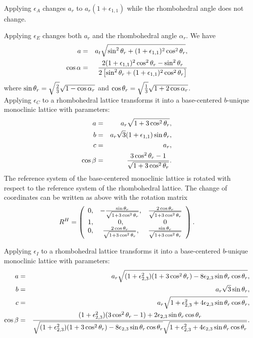 \documentclass[12pt,a4paper]{article}
\begin{document}
Applying $\epsilon_A$ changes $a_r$ to $a_r (1+\epsilon_{1,1})$ while the
rhombohedral angle does not change.

Applying $\epsilon_E$ changes both $a_r$ and the rhombohedral angle
$\alpha_r$. We have 
\begin{eqnarray}
a&=&a_t \sqrt{\sin^2\theta_r + (1 + \epsilon_{1,1})^2 \cos^2\theta_r}, \\
\cos\alpha &=& {
2(1 + \epsilon_{1,1})^2 \cos^2\theta_r -\sin^2\theta_r  \over
2 \left[\sin^2\theta_r+ (1 + \epsilon_{1,1})^2 \cos^2\theta_r\right]}
\end{eqnarray}
where 
$\sin{\theta_r}=\sqrt{2\over 3}\sqrt{1-\cos{\alpha_r}}$
and $\cos{\theta_r}=\sqrt{1\over 3}\sqrt{1 + 2 \cos{\alpha_r}}$. \\

Applying $\epsilon_C$ to a rhombohedral lattice transforms it into a
base-centered $b$-unique monoclinic lattice with parameters:
\begin{eqnarray}
a&=&a_r \sqrt{1 + 3 \cos^2 \theta_r}, \\
b&=&a_r \sqrt{3} (1 + \epsilon_{1,1}) \sin \theta_r, \\
c&=&a_r, \\
\cos\beta &=& {3 \cos^2 \theta_r -1 \over \sqrt{1 + 3 \cos^2 \theta_r} }.
\end{eqnarray}
The reference system of the base-centered monoclinic lattice is rotated 
with respect to the reference system of the rhombohedral lattice.
The change of coordinates can be written as above with the rotation matrix 
\begin{equation}
R^H=\left( \begin{array}{ccc}
0, & -{\sin\theta_r \over \sqrt{1 + 3 \cos^2 \theta_r}}, &  {2\cos\theta_r \over \sqrt{1 + 3 \cos^2 \theta_r}}\\
1, & 0, & 0  
\\
0, & {2\cos\theta_r \over \sqrt{1 + 3 \cos^2 \theta_r}}, & 
{\sin\theta_r \over \sqrt{1 + 3 \cos^2 \theta_r}} 
\end{array}
\right).
\end{equation}

Applying $\epsilon_I$ to a rhombohedral lattice transforms it into a
base-centered $b$-unique monoclinic lattice with parameters:
\begin{eqnarray}
a&=&a_r \sqrt{(1+\epsilon_{2,3}^2)(1 + 3 \cos^2 \theta_r)-
8\epsilon_{2,3}\sin \theta_r\cos \theta_r}, \\
b&=&a_r \sqrt{3}\sin \theta_r, \\
c&=&a_r \sqrt{1+\epsilon_{2,3}^2+4\epsilon_{2,3}\sin \theta_r\cos \theta_r}, \\
\cos\beta &=& {(1+\epsilon_{2,3}^2) (3 \cos^2 \theta_r-1) 
+ 2 \epsilon_{2,3} \sin \theta_r\cos \theta_r
\over \sqrt{(1+\epsilon_{2,3}^2)(1 + 3 \cos^2 \theta_r)-
8\epsilon_{2,3}\sin \theta_r\cos \theta_r} \sqrt{1+\epsilon_{2,3}^2+4\epsilon_{2,3}\sin \theta_r\cos \theta_r}}.
\end{eqnarray}
\end{document}
